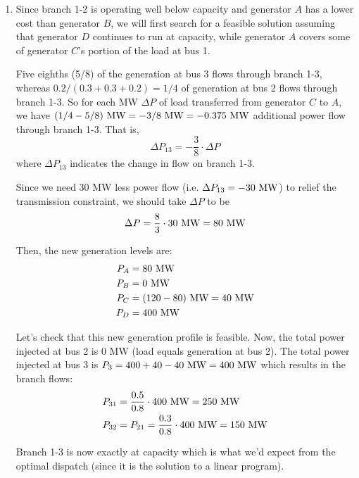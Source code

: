 \documentclass{homework}
\begin{document}
\begin{enumerate}
    \item Since branch 1-2 is operating well below capacity and generator $A$ has a lower
    cost than generator $B$, we will first search for a feasible solution assuming that
    generator $D$ continues to run at capacity, while generator $A$ covers some of
    generator $C$'s portion of the load at bus 1.
    
    Five eighths (5/8) of the generation at bus 3 flows through branch 1-3, whereas
    $0.2 / (0.3 + 0.3 + 0.2) = 1/4$ of generation at bus 2 flows through branch 1-3. So
    for each MW $\Delta P$ of load transferred from generator $C$ to $A$, 
    we have $(1/4 - 5/8) \text{ MW} = -3/8 \text{ MW} = -0.375 \text{ MW}$ additional power flow through branch 1-3.
    That is,
    \begin{equation*}
        \Delta P_{13} = -\frac{3}{8} \cdot \Delta P
    \end{equation*}
    where $\Delta P_{13}$ indicates the change in flow on branch 1-3.
    
    Since we need 30 MW less power flow (i.e. $\Delta P_{13} = -30 \text{ MW}$) to relief the transmission constraint, we should take
    $\Delta P$ to be
    \begin{equation*}
        \Delta P = \frac{8}{3} \cdot 30 \text{ MW} = 80 \text{ MW}
    \end{equation*}

    Then, the new generation levels are:
    \begin{align*}
        P_A &= 80  \text{ MW} \\
        P_B &= 0 \text{ MW} \\
        P_C &= (120 - 80) \text{ MW} = 40 \text{ MW} \\
        P_D &= 400 \text{ MW}
    \end{align*}

    Let's check that this new generation profile is feasible. Now, the total power injected at bus 2 is 0 MW
    (load equals generation at bus 2). The total power injected at 
    bus 3 is $P_3 = 400 + 40 - 40 \text{ MW} = 400 \text{ MW}$ which results in the branch flows:
    \begin{align*}
        P_{31} &= \frac{0.5}{0.8} \cdot 400 \text{ MW} = 250 \text{ MW} \\
        P_{32} &= P_{21} = \frac{0.3}{0.8} \cdot 400 \text{ MW} = 150  \text{ MW} \\
    \end{align*}

    Branch 1-3 is now exactly at capacity which is what we'd expect from the optimal dispatch (since it is the solution to
    a linear program).
\end{enumerate}
\end{document}

